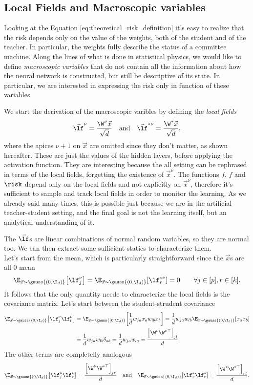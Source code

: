 \subsection{Local Fields and Macroscopic variables}
Looking at the Equation \eqref{eq:theoretical_risk_definition} it's easy to realize
that the risk depends only on the value of the weights, both of the student and of the
teacher. In particular, the weights fully describe the status of a committee machine.
Along the lines of what is done in statistical physics, we would like to define \emph{macroscopic variables}
that do not contain all the information about how the neural network is constructed,
but still be descriptive of its state. In particular, we are interested in expressing
the risk only in function of these variables.

We start the derivation of the macroscopic varibles by defining the \emph{local fields}
\[
  \vec{\lf}^{\nu} = \frac{\W^{\nu}\vec{x}}{\sqrt{{d}}} \quad\text{and}\quad
  \vec{\lf}^{*\nu} = \frac{\W^{*}\vec{x}}{\sqrt{{d}}},
\]
where the apices \({\nu+1}\) on \(\vec{x}\) are omitted since they don't matter,
as shown hereafter. These are just the values of the hidden layers, before applying 
the activation function. They are interesting because the all setting can be rephrased
in terms of the local fields, forgetting the existence of \(\vec{x}^\nu\).
The functions \(f\), \(\hat{f}\) and \(\risk\) depend only on the local fields and not explicitly
on \(\vec{x}^\nu\), therefore it's sufficient to sample and track local fields in order to monitor the learning.
As we already said many times, this is possible just because we are in the artificial
teacher-student setting, and the final goal is not the learning itself, but an analytical
understanding of it.

The \(\vec{\lf}\)s are linear combinations of normal random variables, so they are
normal too. We can then extract some sufficient statics to characterize them.\\
Let's start from the mean, which is particularly straightforward since the \(\vec{x}\)s
are all 0-mean
\[
  \E_{{\vec{x}\sim\gauss{(0,\I_d)}}}{\left[\lf_j^\nu\right]} = \E_{{\vec{x}\sim\gauss{(0,\I_d)}}}{\left[\lf_r^{*\nu}\right]} = 0
  \qquad \forall j\in[p], r\in[k].
\]
It follows that the only quantity neede to characterize the local fields is 
the covariance matrix. 
Let's start between the student-strudent covariance
\[\begin{split}
  \E_{{\vec{x}\sim\gauss{(0,\I_d)}}}{\left[\lf_j^\nu\lf_l^\nu\right]} &= 
  \E_{{\vec{x}\sim\gauss{(0,\I_d)}}}{\left[\frac1d w_{ja}x_a w_{lb}x_b\right]} =
  \frac1dw_{ja}w_{lb}\E_{{\vec{x}\sim\gauss{(0,\I_d)}}}{\left[x_ax_b\right]}\\ &= 
  \frac1dw_{ja}w_{lb} \delta_{ab} = \frac1dw_{ja}w_{la} = \frac{\left[\W^\nu\W^{\nu\top}\right]_{jl}}{d},\\
\end{split}\]
The other terms are completelly analogous
\[
  \E_{{\vec{x}\sim\gauss{(0,\I_d)}}}{\left[\lf_j^\nu\lf_r^{*}\right]} = \frac{\left[\W^\nu\W^{*\top}\right]_{jr}}{d}
  \quad\text{and}\quad
  \E_{{\vec{x}\sim\gauss{(0,\I_d)}}}{\left[\lf_r^*\lf_t^{*}\right]} = \frac{\left[\W^*\W^{*\top}\right]_{rt}}{d}.
\]

